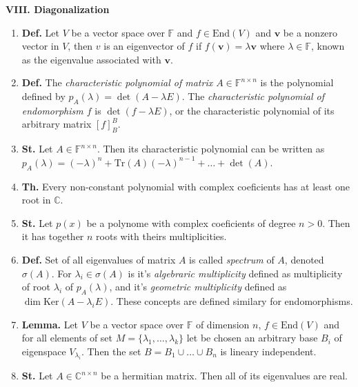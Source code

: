 \documentclass{article}
\newcommand{\<}{\left<}
\renewcommand{\>}{\right>}
\renewcommand{\ker}{\text{Ker}}
\newcommand{\End}{\text{End}}
\newcommand{\Tr}{\text{Tr}}
\newcommand{\C}{\mathbb{C}}
\newcommand{\F}{\mathbb{F}}
\newcommand{\define}{\textbf{Def. }}
\newcommand{\lemma}{\textbf{Lemma. }}
\newcommand{\state}{\textbf{St. }}
\newcommand{\theor}{\textbf{Th. }}
\begin{document}
\begin{multicols}{3}
\begin{enumerate}[itemsep=2pt, topsep=2pt, partopsep=2pt, parsep=2pt]
    \end{enumerate}

    \textbf{VIII. Diagonalization}

    \begin{enumerate}[itemsep=2pt, topsep=2pt, partopsep=2pt, parsep=2pt]


        \item \define Let $V$ be a vector space over $\F$ and $f\in\End(V)$ and $\bm v$ be a nonzero vector in $V$, then $v$ is an eigenvector of $f$ if $f(\bm v)=\lambda\bm v$  where $\lambda\in\F$, known as the eigenvalue associated with $\bm v$.
        \item \define The \emph{characteristic polynomial of matrix $A\in\F^{n\times n}$} is the polynomial defined by $p_{A}(\lambda)=\det\left(A-\lambda E\right)$. The \emph{characteristic polynomial of endomorphism $f$} is $\det\left(f-\lambda E\right)$, or the characteristic polynomial of its arbitrary matrix $\left[f\right]_B^B$.
        \item \state Let $A\in\F^{n\times n}$. Then its characteristic polynomial can be written as $p_A(\lambda)=(-\lambda)^n+\Tr(A)(-\lambda)^{n-1}+\ldots+\det(A)$.
        \item \theor Every non-constant polynomial with complex coeficients has at least one root in $\C$.
        \item \state Let $p(x)$ be a polynome with complex coeficients of degree $n>0$. Then it has together $n$ roots with theirs multiplicities.
        \item \define Set of all eigenvalues of matrix $A$ is called \emph{spectrum} of $A$, denoted $\sigma(A)$. For $\lambda_i\in\sigma(A)$ is it's \emph{algebraric multiplicity} defined as multiplicity of root $\lambda_i$ of $p_A(\lambda)$, and it's \emph{geometric multiplicity} defined as $\dim\ker\left(A-\lambda_iE\right)$. These concepts are defined similary for endomorphisms.
        \item \lemma Let $V$ be a vector space over $\F$ of dimension $n$, $f\in\End(V)$ and for all elements of set $M=\{\lambda_1,\ldots,\lambda_k\}$ let be chosen an arbitrary base $B_i$ of eigenspace $V_{\lambda_i}$. Then the set $B=B_1\cup\ldots\cup B_n$ is lineary independent.
        \item \state Let $A\in\C^{n\times n}$ be a hermitian matrix. Then all of its eigenvalues are real.

\end{enumerate}
\end{multicols}
\end{document}
